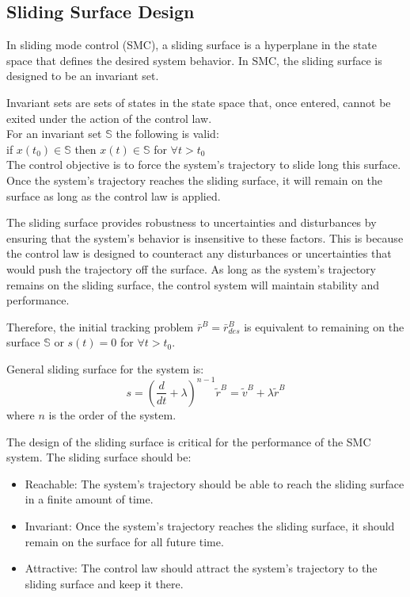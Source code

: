 
\subsection{Sliding Surface Design}
In sliding mode control (SMC), a sliding surface is a hyperplane in 
the state space that defines the desired system behavior. In SMC, the 
sliding surface is designed to be an invariant set.

Invariant sets are sets of states in the state space that, once entered,
cannot be exited under the action of the control law.\\
For an invariant set $\mathbb{S}$ the following is valid:\\
if $x(t_0) \in \mathbb{S}$ 
then $x(t) \in \mathbb{S}$ for $\forall t > t_0 $\\
The control objective is to force the system's trajectory to slide 
long this surface. Once the system's trajectory reaches the sliding surface, 
it will remain on the surface as long as the control law is applied.

The sliding surface provides robustness to uncertainties and 
disturbances by ensuring that the system's behavior is insensitive 
to these factors. This is because the control law is designed to counteract any 
disturbances or uncertainties that would push the trajectory off 
the surface. As long as the system's trajectory remains on the 
sliding surface, the control system will maintain stability and 
performance.

Therefore, the initial tracking problem $\bar{r}^B = \bar{r}_{des}^B$
 is equivalent to remaining on the surface $\mathbb{S}$ or $s(t) = 0$ for $\forall t > t_0$.

General sliding surface for the system is:
$$
s = (\frac{d}{dt} + \lambda)^{n-1}\tilde r^B = \tilde v^B + \lambda \tilde r^B
$$
where $n$ is the order of the system.

The design of the sliding surface is critical for the performance of the SMC system. The sliding surface should be:
\begin{itemize}
    \item Reachable: The system's trajectory should be able to reach the sliding surface in a finite amount of time.
    \item Invariant: Once the system's trajectory reaches the sliding surface, it should remain on the surface for all future time.
    \item Attractive: The control law should attract the system's trajectory to the sliding surface and keep it there.
\end{itemize}

